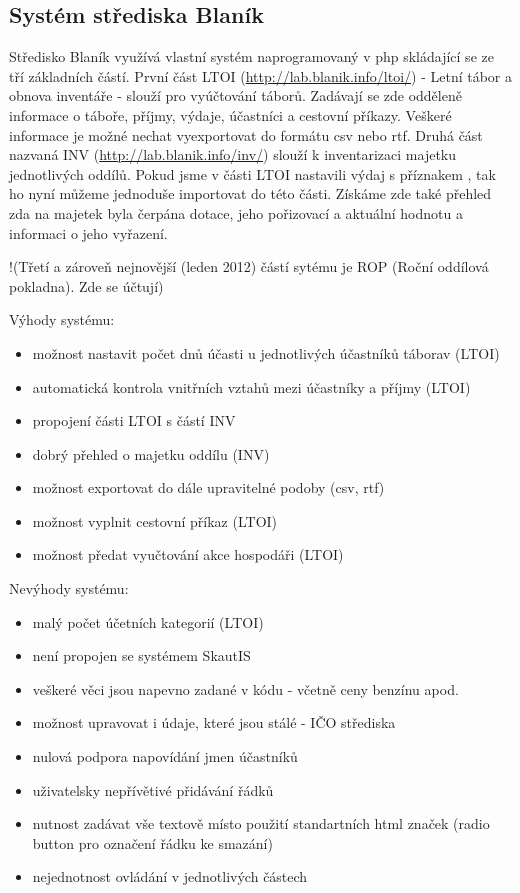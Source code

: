 \documentclass[thesis=B,czech]{FITthesis}[2011/06/14]
\begin{document}
\subsection{Systém střediska Blaník}
Středisko Blaník využívá vlastní systém naprogramovaný v php skládající se ze tří základních částí. První část LTOI (\url{http://lab.blanik.info/ltoi/}) - Letní tábor a obnova inventáře - slouží pro vyúčtování táborů. Zadávají se zde odděleně informace o táboře, příjmy, výdaje, účastníci a cestovní příkazy. Veškeré informace je možné nechat vyexportovat do formátu csv nebo rtf.
Druhá část nazvaná INV  (\url{http://lab.blanik.info/inv/}) slouží k inventarizaci majetku jednotlivých oddílů. Pokud jsme v části LTOI nastavili výdaj s příznakem , tak ho nyní můžeme jednoduše importovat do této části. Získáme zde také přehled zda na majetek byla čerpána dotace, jeho pořizovací a aktuální hodnotu a informaci o jeho vyřazení.

!(Třetí a zároveň nejnovější (leden 2012) částí sytému je ROP (Roční oddílová pokladna). Zde se účtují)

Výhody systému:
\begin{itemize}
	\item možnost nastavit počet dnů účasti u jednotlivých účastníků táborav (LTOI)
	\item automatická kontrola vnitřních vztahů mezi účastníky a příjmy (LTOI)
	\item propojení části LTOI s částí INV 
	\item dobrý přehled o majetku oddílu (INV)
	\item možnost exportovat do dále upravitelné podoby (csv, rtf)
	\item možnost vyplnit cestovní příkaz (LTOI)
	\item možnost předat vyučtování akce hospodáři (LTOI)
\end{itemize}
Nevýhody systému:
\begin{itemize}
	\item malý počet účetních kategorií (LTOI)
	\item není propojen se systémem SkautIS
	\item veškeré věci jsou napevno zadané v kódu - včetně ceny benzínu apod.
	\item možnost upravovat i údaje, které jsou stálé - IČO střediska
	\item nulová podpora napovídání jmen účastníků
	\item uživatelsky nepřívětivé přidávání řádků
	\item nutnost zadávat vše textově místo použití standartních html značek (radio button pro označení řádku ke smazání)
	\item nejednotnost ovládání v jednotlivých částech 
\end{itemize}
\end{document}
